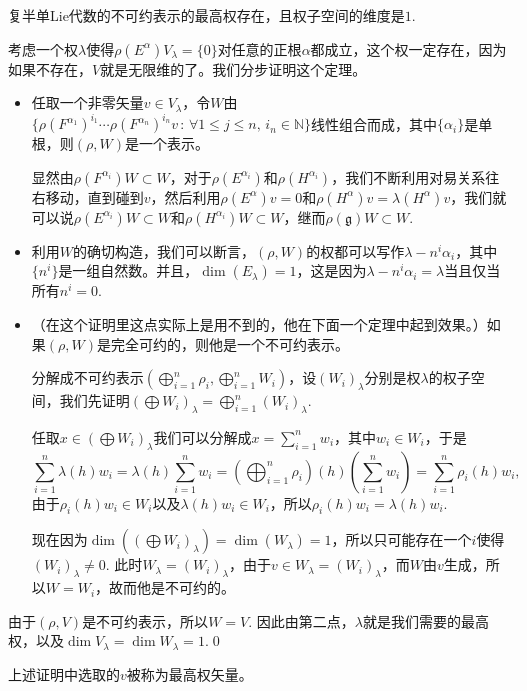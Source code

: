 \documentclass[9pt]{extarticle}
\newcommand{\lag}{{\mathfrak{g}}}
\begin{document}
\theo 复半单Lie代数的不可约表示的最高权存在，且权子空间的维度是$1$.

\proof 考虑一个权$\lambda$使得$\rho(E^\alpha)V_\lambda=\{0\}$对任意的正根$\alpha$都成立，这个权一定存在，因为如果不存在，$V$就是无限维的了。我们分步证明这个定理。

\begin{itemize}
\item 任取一个非零矢量$v\in V_\lambda$，令$W$由$\bigl\{\rho(F^{\alpha_1})^{i_1}\cdots \rho(F^{\alpha_n})^{i_n}v\,:\, \forall 1\leq j\leq n,\, i_n\in \mathbb{N}\bigr\}$线性组合而成，其中$\{\alpha_i\}$是单根，则$(\rho,W)$是一个表示。

显然由$\rho(F^{\alpha_i})W\subset W$，对于$\rho(E^{\alpha_i})$和$\rho(H^{\alpha_i})$，我们不断利用对易关系往右移动，直到碰到$v$，然后利用$\rho(E^\alpha)v=0$和$\rho(H^\alpha)v=\lambda(H^\alpha)v$，我们就可以说$\rho(E^{\alpha_i})W\subset W$和$\rho(H^{\alpha_i})W\subset W$，继而$\rho(\lag)W\subset W$.

\item 利用$W$的确切构造，我们可以断言，$(\rho,W)$的权都可以写作$\lambda-n^i\alpha_i$，其中$\{n^i\}$是一组自然数。并且，$\dim(E_\lambda)=1$，这是因为$\lambda-n^i\alpha_i=\lambda$当且仅当所有$n^i=0$.

\item （在这个证明里这点实际上是用不到的，他在下面一个定理中起到效果。）如果$(\rho,W)$是完全可约的，则他是一个不可约表示。

分解成不可约表示$(\bigoplus_{i=1}^n\rho_i,\bigoplus_{i=1}^n W_i)$，设$(W_i)_\lambda$分别是权$\lambda$的权子空间，我们先证明$(\bigoplus W_i)_\lambda=\bigoplus_{i=1}^n (W_i)_\lambda$.

任取$x\in (\bigoplus W_i)_\lambda$我们可以分解成$x=\sum_{i=1}^nw_i$，其中$w_i\in W_i$，于是
\[
	\sum_{i=1}^n\lambda(h)w_i=\lambda(h)\sum_{i=1}^nw_i=\left(\bigoplus_{i=1}^n\rho_i\right)(h)\left(\sum_{i=1}^nw_i\right)=\sum_{i=1}^n\rho_i(h)w_i,
\]
由于$\rho_i(h)w_i\in W_i$以及$\lambda(h)w_i\in W_i$，所以$\rho_i(h)w_i=\lambda(h)w_i$. 

现在因为$\dim((\bigoplus W_i)_\lambda)=\dim(W_\lambda)=1$，所以只可能存在一个$i$使得$(W_i)_\lambda\neq 0$. 此时$W_\lambda=(W_i)_\lambda$，由于$v\in W_\lambda=(W_i)_\lambda$，而$W$由$v$生成，所以$W=W_i$，故而他是不可约的。
\end{itemize}

由于$(\rho,V)$是不可约表示，所以$W=V$. 因此由第二点，$\lambda$就是我们需要的最高权，以及$\dim V_\lambda=\dim W_\lambda=1$.\qed 

上述证明中选取的$v$被称为最高权矢量。
\end{document}
